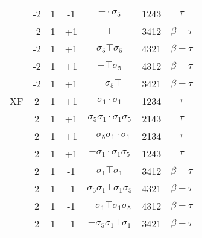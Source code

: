 \begin{table}[h]
\begin{tabular}{c|cccccc}
                    & -2 & 1 & -1 & $-\cdot\sigma_5$ & 1243 &  $\tau$  \\
                    & -2 & 1 & +1 & $\top$ & 3412 &  $\beta-\tau$  \\
                    & -2 & 1 & +1 & $\sigma_5\top\sigma_5$ & 4321 &  $\beta-\tau$  \\
                    & -2 & 1 & +1 & $-\top\sigma_5$ & 4312 &  $\beta-\tau$  \\
                    & -2 & 1 & +1 & $-\sigma_5\top$ & 3421 &  $\beta-\tau$  \\
  \hline
  XF                & 2 & 1 & +1 & $\sigma_1\cdot\sigma_1$ & 1234 &  $\tau$  \\
                    & 2 & 1 & +1 & $\sigma_5\sigma_1\cdot\sigma_1\sigma_5$ & 2143 &  $\tau$  \\
                    & 2 & 1 & +1 & $-\sigma_5\sigma_1\cdot\sigma_1$ & 2134 &  $\tau$  \\
                    & 2 & 1 & +1 & $-\sigma_1\cdot\sigma_1\sigma_5$ & 1243 &  $\tau$  \\
                    & 2 & 1 & -1 & $\sigma_1\top\sigma_1$ & 3412 &  $\beta-\tau$  \\
                    & 2 & 1 & -1 & $\sigma_5\sigma_1\top\sigma_1\sigma_5$ & 4321 &  $\beta-\tau$  \\
                    & 2 & 1 & -1 & $-\sigma_1\top\sigma_1\sigma_5$ & 4312 &  $\beta-\tau$  \\
                    & 2 & 1 & -1 & $-\sigma_5\sigma_1\top\sigma_1$ & 3421 &  $\beta-\tau$  \\
  \end{tabular}
\end{table}
